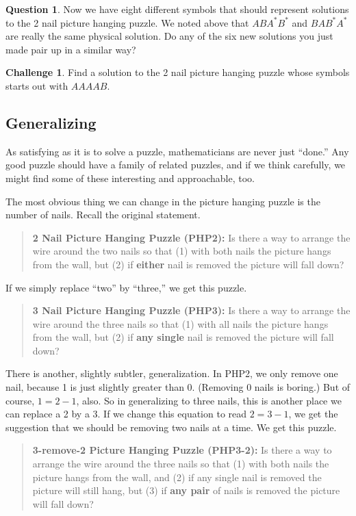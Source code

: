 \documentclass[12pt,letterpaper]{article}
\theoremstyle{definition}
\newtheorem{question}{Question}
\newtheorem*{challenge}{Challenge}
\begin{document}
\begin{question}
Now we have eight different symbols that should represent solutions to the 2 nail picture hanging puzzle.
We noted above that $ABA^*B^*$ and $BAB^*A^*$ are really the same physical solution.
Do any of the six new solutions you just made pair up in a similar way?
\end{question}

\begin{challenge}
Find a solution to the 2 nail picture hanging puzzle whose symbols starts out with $AAAAB$.
\end{challenge}

\subsection*{Generalizing}

As satisfying as it is to solve a puzzle, mathematicians are never just ``done.''
Any good puzzle should have a family of related puzzles, and if we think carefully, we might find some of these interesting and approachable, too.

The most obvious thing we can change in the picture hanging puzzle is the number of nails.
Recall the original statement.
\begin{quotation}
\noindent
\textbf{2 Nail Picture Hanging Puzzle (PHP2):} Is there a way to arrange the wire around the two nails so that (1) with both nails the picture hangs from the wall, but (2) if \textbf{either} nail is removed the picture will fall down?
\end{quotation}

If we simply replace ``two'' by ``three,'' we get this puzzle.
\begin{quotation}
\noindent
\textbf{3 Nail Picture Hanging Puzzle (PHP3):} Is there a way to arrange the wire around the three nails so that (1) with all nails the picture hangs from the wall, but (2) if \textbf{any single} nail is removed the picture will fall down?
\end{quotation}

There is another, slightly subtler, generalization.
In PHP2, we only remove one nail, because 1 is just slightly greater than 0.
(Removing 0 nails is boring.)
But of course, $1=2-1$, also.
So in generalizing to three nails, this is another place we can replace a 2 by a 3.
If we change this equation to read $2 = 3 -1$, we get the suggestion that we should be removing two nails at a time.
We get this puzzle.
\begin{quotation}
\noindent
\textbf{3-remove-2 Picture Hanging Puzzle (PHP3-2):} Is there a way to arrange the wire around the three nails so that (1) with both nails the picture hangs from the wall, and (2) if any single nail is removed the picture will still hang, but (3) if \textbf{any pair} of nails is removed the picture will fall down?
\end{quotation}
\end{document}
